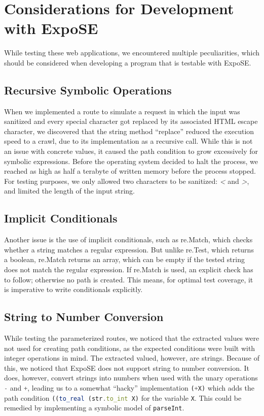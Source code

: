 \section{Considerations for Development with ExpoSE}
\label{sec:peculiarities}
While testing these web applications, we encountered multiple peculiarities, which should be considered when developing a program that is testable with ExpoSE.

\subsection{Recursive Symbolic Operations}
When we implemented a route to simulate a request in which the input was sanitized and every special character got replaced by its associated HTML escape character, we discovered that the string method “replace” reduced the execution speed to a crawl, due to its implementation as a recursive call.
While this is not an issue with concrete values, it caused the path condition to grow excessively for symbolic expressions. Before the operating system decided to halt the process, we reached as high as half a terabyte of written memory before the process stopped. For testing purposes, we only allowed two
characters to be sanitized: \textit{\textless} and \textit{\textgreater}, and limited the length of the input string. 


\subsection{Implicit Conditionals}
Another issue is the use of implicit conditionals, such as re.Match, which checks whether a string matches a regular expression. But unlike re.Test, which returns a boolean, re.Match returns an array, which can be empty if the tested string does not match the regular expression. 
If re.Match is used, an explicit check has to follow; otherwise no path is created. 
This means, for optimal test coverage, it is imperative to write conditionals explicitly. 

\subsection{String to Number Conversion}
While testing the parameterized routes, we noticed that the extracted values were not used for creating path conditions, as the expected conditions were built with integer operations in mind. The extracted valued, however, are strings. Because of this, we noticed that ExpoSE does not support string to number conversion. It does, however, convert strings into numbers when used with the unary operations \lstinline[language=JavaScript]{-} and \lstinline[language=JavaScript]{+}, leading us to a somewhat “hacky” implementation 
\lstinline[language=JavaScript]{(+X)} 
which adds the path condition \lstinline[language=JavaScript]{((to_real (str.to_int X)} 
for the variable \lstinline[language=JavaScript]{X}. 
This could be remedied by implementing a symbolic model of \lstinline[language=JavaScript]{parseInt}.








